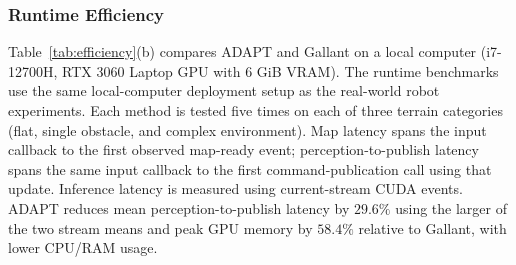 \subsubsection{Runtime Efficiency}
Table~\ref{tab:efficiency}(b) compares ADAPT and Gallant on a local computer (i7-12700H, RTX 3060 Laptop GPU with 6 GiB VRAM). The runtime benchmarks use the same local-computer deployment setup as the real-world robot experiments. Each method is tested five times on each of three terrain categories (flat, single obstacle, and complex environment). Map latency spans the input callback to the first observed map-ready event; perception-to-publish latency spans the same input callback to the first command-publication call using that update. Inference latency is measured using current-stream CUDA events. ADAPT reduces mean perception-to-publish latency by $29.6\%$ using the larger of the two stream means and peak GPU memory by $58.4\%$ relative to Gallant, with lower CPU/RAM usage.


